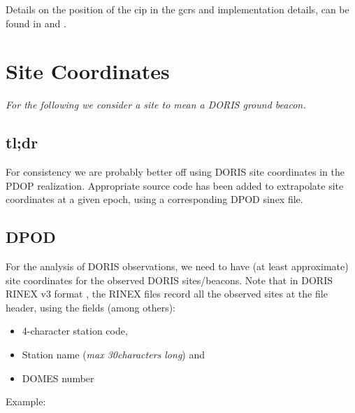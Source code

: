 Details on the position of the \gls{cip} in the \gls{gcrs} and implementation 
details, can be found in \cite{CapitaineAndWallace2006} and 
\cite{Capitaineetal2003a}.

\section{Site Coordinates}
\label{sec:site-coordinates}

\emph{For the following we consider a site to mean a DORIS ground beacon.}

\subsection{tl;dr}
For consistency we are probably better off using DORIS site coordinates in the 
PDOP realization. Appropriate source code has been added to extrapolate site 
coordinates at a given epoch, using a corresponding DPOD \gls{sinex} file.


\subsection{DPOD}
\label{sec:pdop}
For the analysis of DORIS observations, we need to have (at least approximate) 
site coordinates for the observed DORIS sites/beacons. Note that in DORIS RINEX 
v3 format \cite{DORISRNX3}, the RINEX files record all the observed sites at the 
file header, using the fields (among others):
\begin{itemize}
    \item 4-character station code,
    \item Station name (\textit{max 30characters long}) and 
    \item DOMES number
\end{itemize}

Example:


